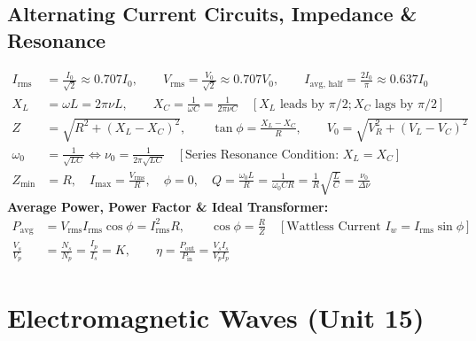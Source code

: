\documentclass[11pt,a4paper]{article}
\begin{document}
\subsection{Alternating Current Circuits, Impedance \& Resonance}

\begin{formulabox}
\begin{align}
  I_{\text{rms}} &= \frac{I_0}{\sqrt{2}} \approx 0.707 I_0, \qquad V_{\text{rms}} = \frac{V_0}{\sqrt{2}} \approx 0.707 V_0, \qquad I_{\text{avg, half}} = \frac{2I_0}{\pi} \approx 0.637 I_0 \\
  X_L &= \omega L = 2\pi\nu L, \qquad X_C = \frac{1}{\omega C} = \frac{1}{2\pi\nu C} \quad [X_L \text{ leads by } \pi/2; X_C \text{ lags by } \pi/2] \\
  Z &= \sqrt{R^2 + (X_L - X_C)^2}, \qquad \tan\phi = \frac{X_L - X_C}{R}, \qquad V_0 = \sqrt{V_R^2 + (V_L - V_C)^2} \\
  \omega_0 &= \frac{1}{\sqrt{LC}} \iff \nu_0 = \frac{1}{2\pi\sqrt{LC}} \quad [\text{Series Resonance Condition: } X_L = X_C] \\
  Z_{\min} &= R, \quad I_{\max} = \frac{V_{\text{rms}}}{R}, \quad \phi = 0, \quad Q = \frac{\omega_0 L}{R} = \frac{1}{\omega_0 C R} = \frac{1}{R}\sqrt{\frac{L}{C}} = \frac{\nu_0}{\Delta\nu}
\end{align}
\textbf{Average Power, Power Factor \& Ideal Transformer:}
\begin{align}
  P_{\text{avg}} &= V_{\text{rms}} I_{\text{rms}} \cos\phi = I_{\text{rms}}^2 R, \qquad \cos\phi = \frac{R}{Z} \quad [\text{Wattless Current } I_w = I_{\text{rms}}\sin\phi] \\
  \frac{V_s}{V_p} &= \frac{N_s}{N_p} = \frac{I_p}{I_s} = K, \qquad \eta = \frac{P_{\text{out}}}{P_{\text{in}}} = \frac{V_s I_s}{V_p I_p}
\end{align}
\end{formulabox}

\newpage

\section{Electromagnetic Waves (Unit 15)}
\end{document}
